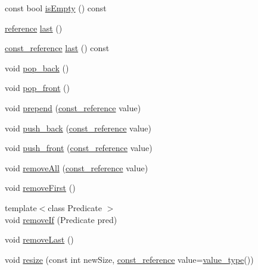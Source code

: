 \begin{DoxyCompactItemize}
\item 
const bool \hyperlink{classprism_1_1_list_a7cbe32ef6d447cc36d004da93df4da12}{is\+Empty} () const 
\item 
\hyperlink{classprism_1_1_list_a87113fe9cf2580e395e3d9f2962f4e81}{reference} \hyperlink{classprism_1_1_list_a674a1f2acb2580b63ec54964334721dd}{last} ()
\item 
\hyperlink{classprism_1_1_list_aa263682b12cb5ca200c1b30f85fac524}{const\+\_\+reference} \hyperlink{classprism_1_1_list_abb8f4bd3584cf4bafe29d250a767021c}{last} () const 
\item 
void \hyperlink{classprism_1_1_list_a22f54a3db3eedf861270b833862fef46}{pop\+\_\+back} ()
\item 
void \hyperlink{classprism_1_1_list_aa469f22e4ccc944268f984258e680ca3}{pop\+\_\+front} ()
\item 
void \hyperlink{classprism_1_1_list_a1c1a0dd2a6218345b50b119deb962813}{prepend} (\hyperlink{classprism_1_1_list_aa263682b12cb5ca200c1b30f85fac524}{const\+\_\+reference} value)
\item 
void \hyperlink{classprism_1_1_list_adf9bf40a902b9628c1f1f07f1e7518d9}{push\+\_\+back} (\hyperlink{classprism_1_1_list_aa263682b12cb5ca200c1b30f85fac524}{const\+\_\+reference} value)
\item 
void \hyperlink{classprism_1_1_list_ad8612f5facddec737ddaa81ab6c9cec6}{push\+\_\+front} (\hyperlink{classprism_1_1_list_aa263682b12cb5ca200c1b30f85fac524}{const\+\_\+reference} value)
\item 
void \hyperlink{classprism_1_1_list_a145f3905ff40c221d95cb858943aa8a6}{remove\+All} (\hyperlink{classprism_1_1_list_aa263682b12cb5ca200c1b30f85fac524}{const\+\_\+reference} value)
\item 
void \hyperlink{classprism_1_1_list_a8a80ca6c53cc3b6cde47b5b11ee4c1aa}{remove\+First} ()
\item 
{\footnotesize template$<$class Predicate $>$ }\\void \hyperlink{classprism_1_1_list_a0cab3235676030fbd9b238be252fb2c9}{remove\+If} (Predicate pred)
\item 
void \hyperlink{classprism_1_1_list_a7b9878e43f08ed5ca8379703342d1f02}{remove\+Last} ()
\item 
void \hyperlink{classprism_1_1_list_a4119f722dcf464610fbfa45b51247912}{resize} (const int new\+Size, \hyperlink{classprism_1_1_list_aa263682b12cb5ca200c1b30f85fac524}{const\+\_\+reference} value=\hyperlink{classprism_1_1_list_a3e9cab77c935e6bc2e96bcb00006382e}{value\+\_\+type}())
\item 

\end{DoxyCompactItemize}
